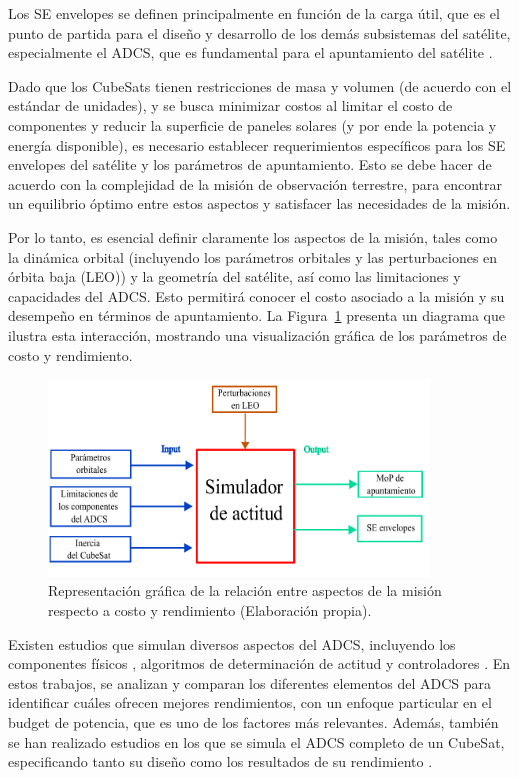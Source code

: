 Los SE envelopes se definen principalmente en función de la carga útil, que es el punto de partida para el diseño y desarrollo de los demás subsistemas del satélite, especialmente el \gls{ADCS}, que es fundamental para el apuntamiento del satélite \cite{ref8}.

Dado que los CubeSats tienen restricciones de masa y volumen (de acuerdo con el estándar de unidades), y se busca minimizar costos al limitar el costo de componentes y reducir la superficie de paneles solares (y por ende la potencia y energía disponible), es necesario establecer requerimientos específicos para los SE envelopes del satélite y los parámetros de apuntamiento. Esto se debe hacer de acuerdo con la complejidad de la misión de observación terrestre, para encontrar un equilibrio óptimo entre estos aspectos y satisfacer las necesidades de la misión.

Por lo tanto, es esencial definir claramente los aspectos de la misión, tales como la dinámica orbital (incluyendo los parámetros orbitales y las perturbaciones en órbita baja (LEO)) y la geometría del satélite, así como las limitaciones y capacidades del \gls{ADCS}. Esto permitirá conocer el costo asociado a la misión y su desempeño en términos de apuntamiento. La Figura~\ref{fig:bloques01} presenta un diagrama que ilustra esta interacción, mostrando una visualización gráfica de los parámetros de costo y rendimiento.

\begin{figure}[h]
	\centering    
	\includegraphics[width=0.9\textwidth]{diagrama memoria1234.pdf}
	\caption{Representación gráfica de la relación entre aspectos de la misión respecto a costo y rendimiento (Elaboración propia).}
	\label{fig:bloques01}
\end{figure}

Existen estudios que simulan diversos aspectos del \gls{ADCS}, incluyendo los componentes físicos \cite{ref12}, algoritmos de determinación de actitud \cite{ref13} y controladores \cite{ref14}. En estos trabajos, se analizan y comparan los diferentes elementos del \gls{ADCS} para identificar cuáles ofrecen mejores rendimientos, con un enfoque particular en el budget de potencia, que es uno de los factores más relevantes. Además, también se han realizado estudios en los que se simula el \gls{ADCS} completo de un CubeSat, especificando tanto su diseño como los resultados de su rendimiento \cite{ref15,ref16,ref17}.

